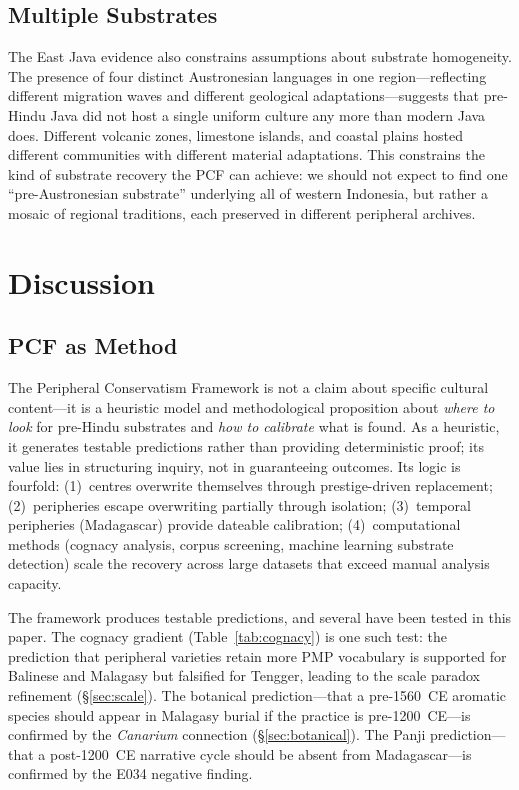 \documentclass[12pt,a4paper]{article}
\begin{document}
\subsection{Multiple Substrates}

The East Java evidence also constrains assumptions about substrate homogeneity. The presence of four distinct Austronesian languages in one region---reflecting different migration waves and different geological adaptations---suggests that pre-Hindu Java did not host a single uniform culture any more than modern Java does. Different volcanic zones, limestone islands, and coastal plains hosted different communities with different material adaptations. This constrains the kind of substrate recovery the PCF can achieve: we should not expect to find one ``pre-Austronesian substrate'' underlying all of western Indonesia, but rather a mosaic of regional traditions, each preserved in different peripheral archives.

\section{Discussion}

\subsection{PCF as Method}

The Peripheral Conservatism Framework is not a claim about specific cultural content---it is a heuristic model and methodological proposition about \emph{where to look} for pre-Hindu substrates and \emph{how to calibrate} what is found. As a heuristic, it generates testable predictions rather than providing deterministic proof; its value lies in structuring inquiry, not in guaranteeing outcomes. Its logic is fourfold: (1)~centres overwrite themselves through prestige-driven replacement; (2)~peripheries escape overwriting partially through isolation; (3)~temporal peripheries (Madagascar) provide dateable calibration; (4)~computational methods (cognacy analysis, corpus screening, machine learning substrate detection) scale the recovery across large datasets that exceed manual analysis capacity.

The framework produces testable predictions, and several have been tested in this paper. The cognacy gradient (Table~\ref{tab:cognacy}) is one such test: the prediction that peripheral varieties retain more PMP vocabulary is supported for Balinese and Malagasy but falsified for Tengger, leading to the scale paradox refinement (\S\ref{sec:scale}). The botanical prediction---that a pre-1560~CE aromatic species should appear in Malagasy burial if the practice is pre-1200~CE---is confirmed by the \emph{Canarium} connection (\S\ref{sec:botanical}). The Panji prediction---that a post-1200~CE narrative cycle should be absent from Madagascar---is confirmed by the E034 negative finding.
\end{document}
